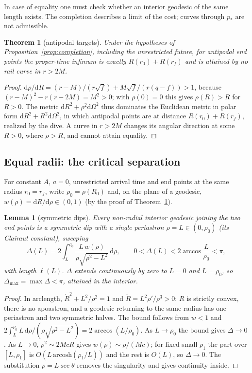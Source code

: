 \documentclass[aip,jmp,amsmath,amssymb,reprint]{revtex4-2}
\newcommand{\dd}{\mathrm{d}}
\theoremstyle{plain}
\newtheorem{theorem}{Theorem}
\newtheorem{lemma}[proposition]{Lemma}
\theoremstyle{definition}
\begin{document}
In case of equality one must check whether an interior geodesic of the same length exists.
The completion describes a limit of the cost; curves through $p_*$ are not admissible.

\begin{theorem}[antipodal targets]\label{thm:antipodal}
Under the hypotheses of Proposition~\ref{prop:completion}, including the unrestricted
future, for antipodal end points the
proper-time infimum is exactly $R(r_0)+R(r_f)$ and is attained by no rail curve in $r>2M$.
\end{theorem}

\begin{proof}
$\dd\rho/\dd R=(r-M)/(r\sqrt f)+M\sqrt f/(r(q-f))>1$, because $(r-M)^2-r(r-2M)=M^2>0$; with
$\rho(0)=0$ this gives $\rho(R)>R$ for $R>0$. The metric $\dd R^2+\rho^2\dd\Omega^2$ thus
dominates the Euclidean metric in polar form $\dd R^2+R^2\dd\Omega^2$, in which antipodal
points are at distance $R(r_0)+R(r_f)$, realized by the dive. A curve in $r>2M$ changes its
angular direction at some $R>0$, where $\rho>R$, and cannot attain equality.
\end{proof}

\subsection{Equal radii: the critical separation}
For constant $A$, $a=0$, unrestricted arrival time and end points at the same radius
$r_0=r_f$, write $\rho_0=\rho(R_0)$ and, on the plane of a geodesic, $w(\rho)=\dd R/\dd\rho\in(0,1)$
(by the proof of Theorem~\ref{thm:antipodal}).

\begin{lemma}[symmetric dips]\label{lem:dips}
Every non-radial interior geodesic joining the two end points is a symmetric dip with a
single periastron $\rho=L\in(0,\rho_0)$ (its Clairaut constant), sweeping
\[
  \Delta(L)=2\int_L^{\rho_0}\frac{L\,w(\rho)}{\rho\sqrt{\rho^2-L^2}}\,\dd\rho,\qquad
  0<\Delta(L)<2\arccos\frac L{\rho_0}<\pi ,
\]
with length $\ell(L)$. $\Delta$ extends continuously by zero to $L=0$ and $L=\rho_0$, so
$\Delta_{\max}=\max\Delta<\pi$, attained in the interior.
\end{lemma}

\begin{proof}
In arclength, $\dot R^2+L^2/\rho^2=1$ and $\ddot R=L^2\rho'/\rho^3>0$: $R$ is strictly convex,
there is no apoastron, and a geodesic returning to the same radius has one periastron and two
symmetric halves. The bound follows from $w<1$ and
$2\int_L^{\rho_0}L\,\dd\rho/(\rho\sqrt{\rho^2-L^2})=2\arccos(L/\rho_0)$. As $L\to\rho_0$ the bound gives
$\Delta\to0$. As $L\to0$, $\rho^2\sim2McR$ gives $w(\rho)\sim\rho/(Mc)$; for fixed small $\rho_1$ the
part over $[L,\rho_1]$ is $O(L\,\mathrm{arcosh}(\rho_1/L))$ and the rest is $O(L)$, so $\Delta\to0$.
The substitution $\rho=L\sec\theta$ removes the singularity and gives continuity inside.
\end{proof}
\end{document}
